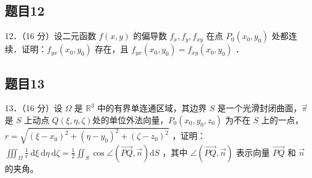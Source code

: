 \documentclass{article}
\begin{document}
\subsection{题目12}
12．（16 分）设二元函数 \(f(x, y)\) 的偏导数 \(f_{x}, f_{y}, f_{x y}\) 在点 \(P_{0}\left(x_{0}, y_{0}\right)\) 处都连续．证明：\(f_{y x}\left(x_{0}, y_{0}\right)\) 存在，且 \(f_{y x}\left(x_{0}, y_{0}\right)=f_{x y}\left(x_{0}, y_{0}\right)\) ．

\subsection{题目13}
13．（16 分）设 \(\Omega\) 是 \(\mathbb{R}^{3}\) 中的有界单连通区域，其边界 \(S\) 是一个光滑封闭曲面，\(\vec{\pi}\) 是 \(S\) 上动点 \(Q(\xi, \eta, \zeta)\)处的单位外法向量，\(P_{0}\left(x_{0}, y_{0}, z_{0}\right)\) 为不在 \(S\) 上的一点，\(r=\sqrt{\left(\xi-x_{0}\right)^{2}+\left(\eta-y_{0}\right)^{2}+\left(\zeta-z_{0}\right)^{2}}\) ，证明： \(\iiint_{\Omega} \frac{1}{r} \mathrm{~d} \xi \mathrm{~d} \eta \mathrm{~d} \zeta=\frac{1}{2} \iint_{S} \cos \angle(\overrightarrow{P Q}, \vec{n}) \mathrm{d} S\) ，其中 \(\angle(\overrightarrow{P Q}, \vec{n})\) 表示向量 \(\overrightarrow{P Q}\) 和 \(\vec{n}\) 的夹角。
\end{document}
